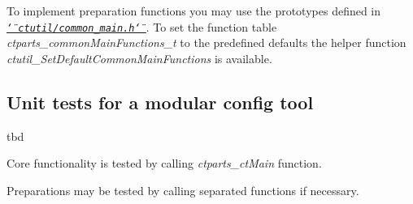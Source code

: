 To implement preparation functions you may use the prototypes defined in \href{common_main_8h.html}{\tt {\itshape \char`\"{}ctutil/common\+\_\+main.\+h\char`\"{}}}. To set the function table {\itshape ctparts\+\_\+common\+Main\+Functions\+\_\+t} to the predefined defaults the helper function {\itshape ctutil\+\_\+\+Set\+Default\+Common\+Main\+Functions} is available.

\subsection*{Unit tests for a modular config tool}

tbd

Core functionality is tested by calling {\itshape ctparts\+\_\+ct\+Main} function.

Preparations may be tested by calling separated functions if necessary. 